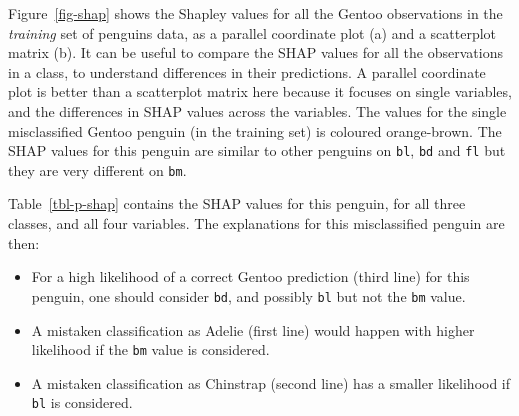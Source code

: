 \documentclass[
  letterpaper,
]{krantz}
\providecommand{\tightlist}{%
  \setlength{\itemsep}{0pt}\setlength{\parskip}{0pt}}
\begin{document}
Figure~\ref{fig-shap} shows the Shapley values for all the Gentoo
observations in the \emph{training} set of penguins data, as a parallel
coordinate plot (a) and a scatterplot matrix (b). It can be useful to
compare the SHAP values for all the observations in a class, to
understand differences in their predictions. A parallel coordinate plot
is better than a scatterplot matrix here because it focuses on single
variables, and the differences in SHAP values across the variables. The
values for the single misclassified Gentoo penguin (in the training set)
is coloured orange-brown. The SHAP values for this penguin are similar
to other penguins on \texttt{bl}, \texttt{bd} and \texttt{fl} but they
are very different on \texttt{bm}. 

Table~\ref{tbl-p-shap} contains the SHAP values for this penguin, for
all three classes, and all four variables. The explanations for this
misclassified penguin are then:

\begin{itemize}
\tightlist
\item
  For a high likelihood of a correct Gentoo prediction (third line) for
  this penguin, one should consider \texttt{bd}, and possibly
  \texttt{bl} but not the \texttt{bm} value.
\item
  A mistaken classification as Adelie (first line) would happen with
  higher likelihood if the \texttt{bm} value is considered.
\item
  A mistaken classification as Chinstrap (second line) has a smaller
  likelihood if \texttt{bl} is considered.
\end{itemize}

\end{document}
